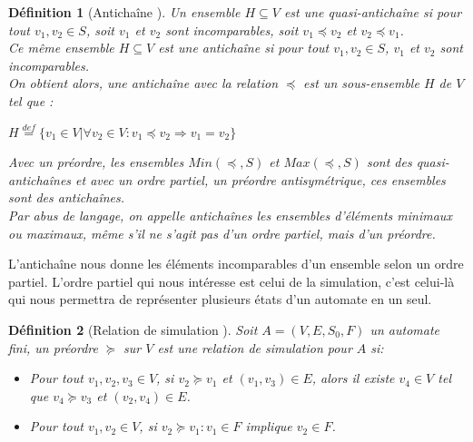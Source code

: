 \documentclass[12pt,a4paper,oneside]{book}
\theoremstyle{break}
\newtheorem{defin}{Définition}[chapter]
\theoremstyle{breakplain}
\begin{document}
\begin{defin}[Antichaîne \cite{doyen2010antichain}]
Un ensemble $H \subseteq V$ est une quasi-antichaîne si pour tout $v_1 , v_2 \in S$, soit $v_1$ et $v_2$ sont incomparables, soit $ v_1 \preceq v_2$ et $v_2 \preceq v_1$.\\
Ce même ensemble $H \subseteq V$ est une antichaîne si pour tout $v_1 , v_2 \in S$, $v_1$ et $v_2$ sont incomparables.\\
On obtient alors, une antichaîne avec la relation $\preceq$ est un sous-ensemble $H$ de $V$ tel que :

\begin{center}
$H \overset{def}{=} \{v_1 \in V|\forall v_2 \in V : v_1 \preceq v_2 \Rightarrow v_1 = v_2\}$
\end{center}

Avec un préordre, les ensembles $Min(\preceq, S)$ et $Max(\preceq, S)$ sont des quasi-antichaînes et avec un ordre partiel, un préordre antisymétrique, ces ensembles sont des antichaînes.\\

Par abus de langage, on appelle antichaînes les ensembles d'éléments minimaux ou maximaux, même s'il ne s'agit pas d'un ordre partiel, mais d'un préordre.
\end{defin}

\pagebreak

L'antichaîne nous donne les éléments incomparables d'un ensemble selon un ordre partiel. L'ordre partiel qui nous intéresse est celui de la simulation, c'est celui-là qui nous permettra de représenter plusieurs états d'un automate en un seul.\\

\begin{defin}[Relation de simulation \cite{geeraerts2013multiprocessor}]
Soit $A = (V,E,S_0,F)$ un automate fini, un préordre $\succeq$ sur $V$ est une relation de simulation pour $A$ si:
\begin{itemize}

\item Pour tout $v_1, v_2, v_3 \in V$, si $v_2 \succeq v_1$ et $(v_1, v_3) \in E$, alors il existe $v_4 \in V$ tel que $v_4 \succeq v_3$ et $(v_2, v_4) \in E$.
\item Pour tout $v_1, v_2 \in V$, si $v_2 \succeq v_1 : v_1 \in F$ implique $v_2 \in F$.


\end{itemize}
\end{defin}
\end{document}
